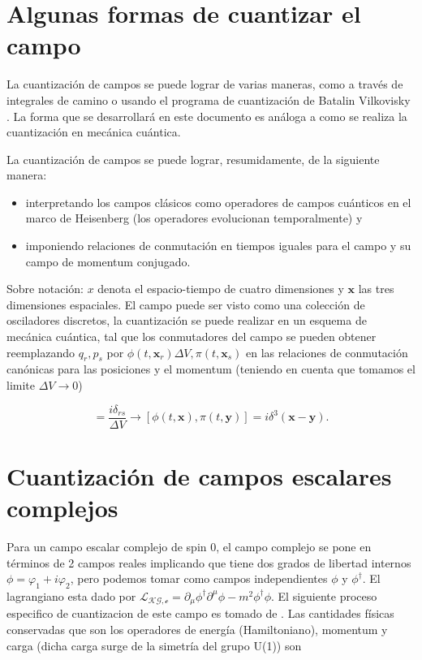 \documentclass{article}
\begin{document}
\section{Algunas formas de cuantizar el campo}
La cuantización de campos se puede lograr de varias maneras, como a través de integrales de camino o usando el programa de cuantización de Batalin Vilkovisky \cite{Kaku:1993}. La forma que se desarrollará en este documento es análoga a como se realiza la cuantización en mecánica cuántica. 

La cuantización de campos se puede lograr, resumidamente, de la siguiente manera:
\begin{itemize}
\item interpretando los campos clásicos como operadores de campos cuánticos en el marco de Heisenberg (los operadores evolucionan temporalmente) y 
\item imponiendo relaciones de conmutación en tiempos iguales para el campo y su campo de momentum conjugado.
\end{itemize}
Sobre notación: $x$ denota el espacio-tiempo de cuatro dimensiones y $\mathbf{x}$ las tres dimensiones espaciales.
El campo puede ser visto como una colección de osciladores discretos, la cuantización se puede realizar en un esquema de mecánica cuántica, tal que los conmutadores del campo se pueden obtener reemplazando $q_r, p_s$ por $\phi(t,\mathbf{x}_r) \Delta V, \pi(t,\mathbf{x}_s)$ en las relaciones de conmutación canónicas para las posiciones y el momentum (teniendo en cuenta que tomamos el limite $\Delta V \rightarrow 0 $)

\begin{equation}
  [\phi(t,\mathbf{x}_r),\pi(t,\mathbf{x}_s)] = \frac{i \delta_{rs}}{\Delta V} \longrightarrow  [\phi(t,\mathbf{x}),\pi(t,\mathbf{y})] = i\delta^3(\mathbf{x}-\mathbf{y}).
\end{equation}

\section{Cuantización de campos escalares complejos}
Para un campo escalar complejo de spin $0$, el campo complejo se pone en términos de 2 campos reales implicando que tiene dos grados de libertad internos $\phi =\varphi_1 + i\varphi_2$, pero podemos tomar como campos independientes $\phi$ y  $\phi^\dagger$. El lagrangiano esta dado por $\mathscr{L_{KG,c}}=\partial_\mu \phi^\dagger \partial^\mu \phi - m^2 \phi^\dagger \phi$. El siguiente proceso especifico de cuantizacion de este campo es tomado de \cite{Nagashima:2010}.
Las cantidades físicas conservadas que son los operadores de energía (Hamiltoniano), momentum y carga (dicha carga surge de la simetría del grupo U(1)) son
\end{document}
